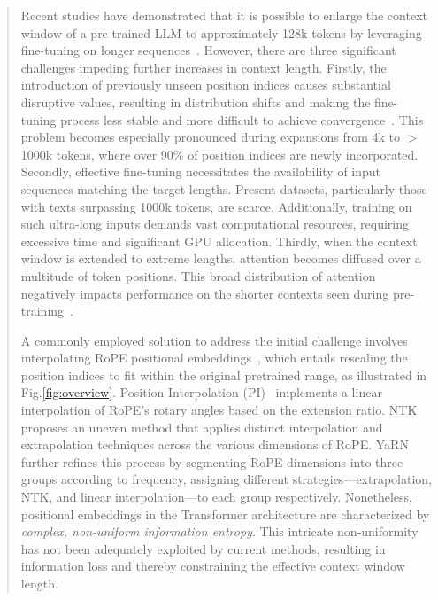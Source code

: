 \begin{abstract}
Recent studies have demonstrated that it is possible to enlarge the context window of a pre-trained LLM to approximately 128k tokens by leveraging fine-tuning on longer sequences~\cite{longlora,pi,yarn,zhang2024soaring,liu2023scaling}. However, there are three significant challenges impeding further increases in context length. Firstly, the introduction of previously unseen position indices causes substantial disruptive values, resulting in distribution shifts and making the fine-tuning process less stable and more difficult to achieve convergence~\cite{pi}. This problem becomes especially pronounced during expansions from 4k to $>$1000k tokens, where over 90\% of position indices are newly incorporated. Secondly, effective fine-tuning necessitates the availability of input sequences matching the target lengths. Present datasets, particularly those with texts surpassing 1000k tokens, are scarce. Additionally, training on such ultra-long inputs demands vast computational resources, requiring excessive time and significant GPU allocation. Thirdly, when the context window is extended to extreme lengths, attention becomes diffused over a multitude of token positions. This broad distribution of attention negatively impacts performance on the shorter contexts seen during pre-training~\cite{pi}.

A commonly employed solution to address the initial challenge involves interpolating RoPE positional embeddings~\cite{rope,pi}, which entails rescaling the position indices to fit within the original pretrained range, as illustrated in Fig.\ref{fig:overview}. Position Interpolation (PI)~\cite{pi} implements a linear interpolation of RoPE's rotary angles based on the extension ratio. NTK~\cite{ntk,dynamicntk} proposes an uneven method that applies distinct interpolation and extrapolation techniques across the various dimensions of RoPE. YaRN~\cite{yarn} further refines this process by segmenting RoPE dimensions into three groups according to frequency, assigning different strategies—extrapolation, NTK, and linear interpolation—to each group respectively. Nonetheless, positional embeddings in the Transformer architecture are characterized by \emph{complex, non-uniform information entropy}. This intricate non-uniformity has not been adequately exploited by current methods, resulting in information loss and thereby constraining the effective context window length.


\end{abstract}

